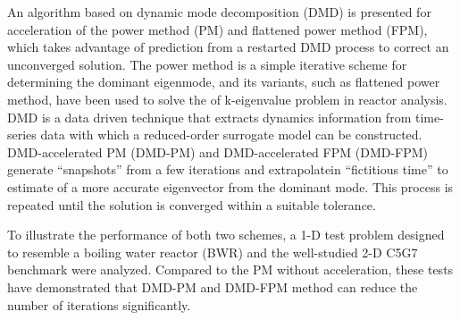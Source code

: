
\pagestyle{empty}
\setlength{\baselineskip}{0.8cm}



An algorithm based on dynamic mode decomposition (DMD) is presented for acceleration of the power method (PM) and flattened power method (FPM), which takes advantage of prediction from a restarted DMD process to correct an unconverged solution.
The power method is a simple iterative scheme for determining the dominant eigenmode, and its variants, such as flattened power method, have been used to solve the of k-eigenvalue problem in reactor analysis.
DMD is a data driven technique that extracts dynamics information from time-series data with which a reduced-order surrogate model can be constructed.
DMD-accelerated PM (DMD-PM) and DMD-accelerated FPM (DMD-FPM) generate ``snapshots'' from a few iterations and extrapolatein ``fictitious time'' to estimate of a more accurate eigenvector from the dominant mode.  
This process is repeated until the solution is converged within a suitable tolerance.

To illustrate the performance of both two schemes, a 1-D test problem designed to resemble a boiling water reactor (BWR) and the well-studied 2-D C5G7 benchmark were analyzed.
Compared to the PM without acceleration, these tests have demonstrated that DMD-PM and DMD-FPM method can reduce the number of iterations significantly.


